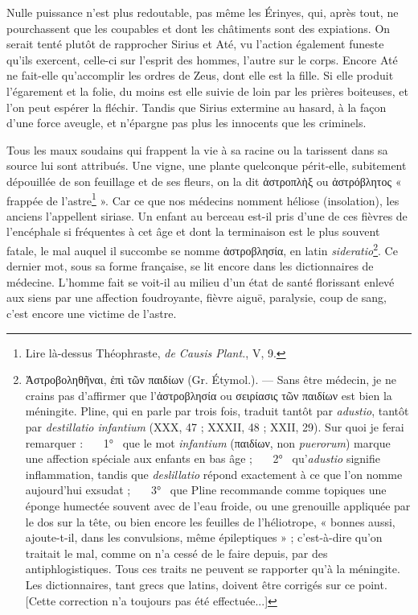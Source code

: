 \documentclass{book}%
\newcommand{\italique}[1]{\textit{#1}}%
\newcommand{\note}[1]{\footnote{#1}}
\begin{document}
Nulle puissance n'est plus redoutable, pas même les Érinyes, qui, après tout, ne pourchassent que les coupables et dont les châtiments sont des expiations. On serait tenté plutôt de rapprocher Sirius et Até, vu l'action également funeste qu'ils exercent, celle-ci sur l'esprit des hommes, l'autre sur le corps. Encore Até ne fait-elle qu'accomplir les ordres de Zeus, dont elle est la fille. Si elle produit l'égarement et la folie, du moins est elle suivie de loin par les prières boiteuses, et l'on peut espérer la fléchir. Tandis que Sirius extermine au hasard, à la façon d'une force aveugle, et n'épargne pas plus les innocents que les criminels. 

Tous les maux soudains qui frappent la vie à sa racine ou la tarissent dans sa source lui sont attribués. Une vigne, une plante quelconque périt-elle, subitement dépouillée de son feuillage et de ses fleurs, on la dit ἀστροπλὴξ ou ἀστρόβλητος « frappée de l'astre\note{Lire là-dessus Théophraste, \italique{de Causis Plant.}, V, 9.} ». Car ce que nos médecins nomment héliose (insolation), les anciens l'appellent siriase. Un enfant au berceau est-il pris d'une de ces fièvres de l'encéphale si fréquentes à cet âge et dont la terminaison est le plus souvent fatale, le mal auquel il succombe se nomme ἀστροβλησία, en latin \italique{sideratio}\note{Ἀστροβοληθῆναι, ἐπὶ τῶν παιδίων (Gr. Étymol.). — Sans être médecin, je ne crains pas d'affirmer que l'ἀστροβλησία  ou σειρίασις τῶν παιδίων est bien la méningite. Pline, qui en parle par trois fois, traduit tantôt par \italique{adustio}, tantôt par \italique{destillatio infantium} (XXX, 47 ; XXXII, 48 ; XXII, 29). Sur quoi je ferai remarquer : \ \ \ 1° \ que le mot \italique{infantium} (παιδίων, non \italique{puerorum}) marque une affection spéciale aux enfants en bas âge ; \ \ \ 2° \  qu'\italique{adustio} signifie inflammation, tandis que \italique{deslillatio} répond exactement à ce que l'on nomme aujourd'hui exsudat ; \ \ \ 3° \ que Pline recommande comme topiques une éponge humectée souvent avec de l'eau froide, ou une grenouille appliquée par le dos sur la tête, ou bien encore les feuilles de l'héliotrope, « bonnes aussi, ajoute-t-il, dans les convulsions, même épileptiques » ; c'est-à-dire qu'on traitait le mal, comme on n'a cessé de le faire depuis, par des antiphlogistiques. Tous ces traits ne peuvent se rapporter qu'à la méningite. Les dictionnaires, tant grecs que latins, doivent être corrigés sur ce point. [Cette correction n'a toujours pas été effectuée...]}. Ce dernier mot, sous sa forme française, se lit encore dans les dictionnaires de médecine. L'homme fait se voit-il au milieu d'un état de santé florissant enlevé aux siens par une affection foudroyante, fièvre aiguë, paralysie, coup de sang, c'est encore une victime de l'astre. 
\end{document}
